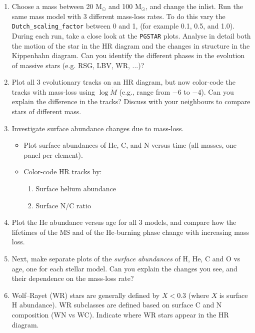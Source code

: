 \documentclass[11pt,a4paper]{article}
\begin{document}
\begin{enumerate}[label=(\alph*)]
\item Choose a mass between 20 M$_\odot$ and 100 M$_\odot$, and change the inlist. 
Run the same mass model with 3 different mass-loss rates. To do this vary the \verb|Dutch_scaling_factor| between 0 and 1, (for example 0.1, 0.5, and 1.0). 
During each run, take a close look at the \texttt{PGSTAR} plots. Analyse in detail both the motion of the star in the HR diagram and the changes in structure in the Kippenhahn diagram. Can you identify the different phases in the evolution of massive stars (e.g. RSG, LBV, WR, ...)? 

\item Plot all 3 evolutionary tracks on an HR diagram, but now color-code the tracks with mass-loss using $\log \dot{M}$ (e.g., range from $-6$ to $-4$).
Can you explain the difference in the tracks? 
Discuss with your neighbours to compare stars of different mass.

\item Investigate surface abundance changes due to mass-loss. 
\begin{itemize}
    \item Plot surface abundances of He, C, and N versus time (all masses, one panel per element).
    \item Color-code HR tracks by:
    \begin{enumerate}
        \item Surface helium abundance
        \item Surface N/C ratio
    \end{enumerate}

\end{itemize}

\item Plot the He abundance versus age for all 3 models, and compare how the lifetimes of the MS and of the He-burning phase change with increasing mass loss.

\item Next, make separate plots of the \emph{surface abundances} of H, He, C and O vs age, one for each stellar model. Can you explain the changes you see, and their dependence on the mass-loss rate?


\item Wolf–Rayet (WR) stars are generally defined by $X < 0.3$ (where $X$ is surface H abundance). WR subclasses are defined based on surface C and N composition (WN vs WC). Indicate where WR stars appear in the HR diagram.


\end{enumerate}
\end{document}
